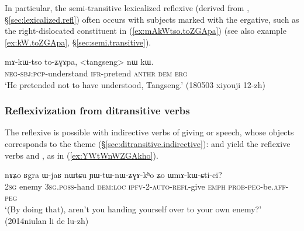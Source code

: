 In particular, the semi-transitive lexicalized reflexive  (derived from , §\ref{sec:lexicalized.refl}) often occurs with subjects marked with the ergative, such as the right-dislocated constituent  in (\ref{ex:mAkWtso.toZGApa})  (see also example \ref{ex:kW.toZGApa}, §\ref{sec:semi.transitive}).
 
 \begin{exe}
\ex \label{ex:mAkWtso.toZGApa}
 \gll  mɤ-kɯ-tso to-ʑɣɤpa, <tangseng> nɯ kɯ. \\
 \textsc{neg}-\textsc{sbj}:\textsc{pcp}-understand \textsc{ifr}-pretend  \textsc{anthr} \textsc{dem} \textsc{erg} \\
 \glt  `He pretended not to have understood, Tangseng.' (180503 xiyouji 12-zh)
 \end{exe}
% 
 
  \subsubsection{Reflexivization from ditransitive verbs} \label{sec:refl.ditransitive}
The reflexive is possible with indirective verbs of giving or speech, whose objects corresponds to the theme (§\ref{sec:ditransitive.indirective}):  and  yield the reflexive verbs  and , as in (\ref{ex:YWtWnWZGAkho}). 

\begin{exe}
\ex \label{ex:YWtWnWZGAkho}
 \gll nɤʑo ʁgra ɯ-jaʁ nɯtɕu ɲɯ-tɯ-nɯ-ʑɣɤ-kʰo ʑo ɯmɤ-kɯ-ɕti-ci? \\
 \textsc{2sg} enemy \textsc{3sg}.\textsc{poss}-hand \textsc{dem}:\textsc{loc} \textsc{ipfv}-2-\textsc{auto}-\textsc{refl}-give \textsc{emph} \textsc{prob}-\textsc{peg}-be.\textsc{aff}-\textsc{peg} \\
 \glt `(By doing that), aren't you handing yourself over to your own enemy?' (2014niulan li de lu-zh)
 \end{exe}
 
